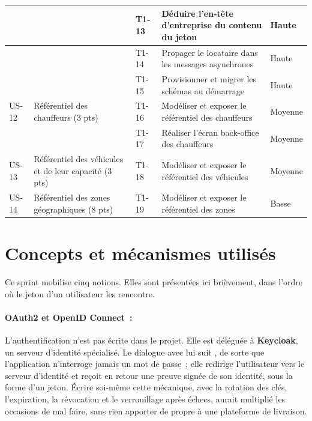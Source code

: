 \begin{small}
\begin{longtable}{L{1.1cm}L{3.0cm}L{1.2cm}L{7.0cm}L{1.4cm}}
\hline
      &  & T1-13 & Déduire l'en-tête d'entreprise du contenu du jeton & Haute \\
\hline
      &  & T1-14 & Propager le locataire dans les messages asynchrones & Haute \\
\hline
      &  & T1-15 & Provisionner et migrer les schémas au démarrage & Haute \\
\hline
US-12 & Référentiel des chauffeurs (3 pts) & T1-16 & Modéliser et exposer le référentiel des chauffeurs & Moyenne \\
\hline
      &  & T1-17 & Réaliser l'écran back-office des chauffeurs & Moyenne \\
\hline
US-13 & Référentiel des véhicules et de leur capacité (3 pts) & T1-18 & Modéliser et exposer le référentiel des véhicules & Moyenne \\
\hline
US-14 & Référentiel des zones géographiques (8 pts) & T1-19 & Modéliser et exposer le référentiel des zones & Basse \\
\hline
\end{longtable}
\end{small}

\section{Concepts et mécanismes utilisés}

Ce sprint mobilise cinq notions. Elles sont présentées ici brièvement, dans l'ordre où le jeton d'un
utilisateur les rencontre.

\paragraph{OAuth2 et OpenID Connect~:} L'authentification n'est pas écrite dans le projet. Elle est
déléguée à \textbf{Keycloak}, un serveur d'identité spécialisé. Le dialogue avec lui suit
, de sorte que l'application n'interroge jamais un mot de passe~; elle redirige
l'utilisateur vers le serveur d'identité et reçoit en retour une preuve signée de son identité, sous
la forme d'un jeton. Écrire soi-même cette mécanique, avec la rotation des clés, l'expiration, la révocation et le
verrouillage après échecs, aurait multiplié les occasions de mal faire, sans rien apporter de propre à une
plateforme de livraison.


